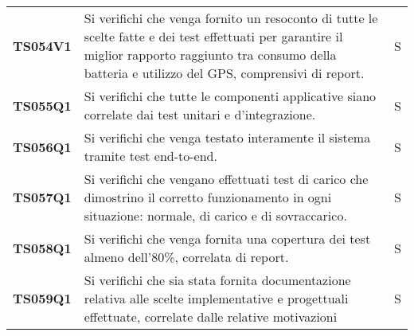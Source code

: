 \documentclass[../../piano-di-qualifica.tex]{subfiles}
\begin{document}
\begin{longtable}[H]{>{\centering\bfseries}m{3cm} >{}m{10cm} >{\centering\arraybackslash}m{3cm}}
  TS054V1            & Si verifichi che venga fornito un resoconto di tutte le scelte fatte e dei test effettuati per garantire il miglior rapporto raggiunto tra consumo della batteria e utilizzo del GPS, comprensivi di report.
                     & S                                                                                                                                                                                                                                                  \\

  TS055Q1            & Si verifichi che tutte le componenti applicative siano correlate dai test unitari e d'integrazione.
                     & S                                                                                                                                                                                                                                                   \\

  TS056Q1            & Si verifichi che venga testato interamente il sistema tramite test end-to-end.
                     & S                                                                                                                                                                                                                                                   \\

  TS057Q1            & Si verifichi che vengano effettuati test di carico che dimostrino il corretto funzionamento in ogni situazione: normale, di carico e di sovraccarico.
                     & S                                                                                                                                                                                                                                                  \\

  TS058Q1            & Si verifichi che venga fornita una copertura dei test almeno dell'80\%, correlata di report.
                     & S                                                                                                                                                                                                                                                   \\


  TS059Q1            & Si verifichi che sia stata fornita documentazione relativa alle scelte implementative e progettuali effettuate, correlate dalle relative motivazioni
                     & S                                                                                                                                                                                                                                                   \\


\end{longtable}
\end{document}
